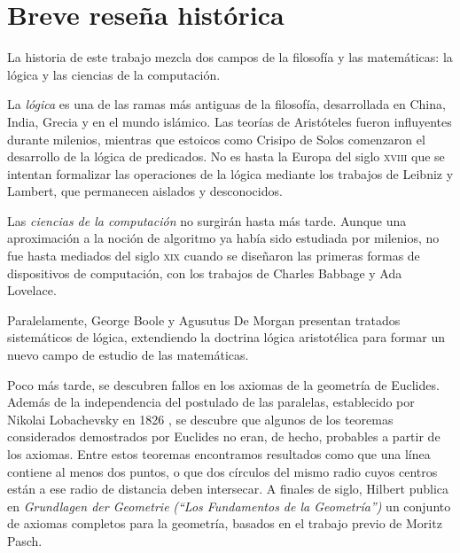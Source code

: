 

\chapter{Breve reseña histórica}\label{ch:historia}

La historia de este trabajo mezcla dos campos de la filosofía y las matemáticas: la lógica y las ciencias de la computación.

La \emph{lógica} es una de las ramas más antiguas de la filosofía, desarrollada en China, India, Grecia y en el mundo islámico. Las teorías de Aristóteles fueron influyentes durante milenios, mientras que estoicos como Crisipo de Solos comenzaron el desarrollo de la lógica de predicados. No es hasta la Europa del siglo \textsc{xviii} que se intentan formalizar las operaciones de la lógica mediante los trabajos de Leibniz y Lambert, que permanecen aislados y desconocidos. \cite{Katz2009}

Las \emph{ciencias de la computación} no surgirán hasta más tarde. Aunque una aproximación a la noción de algoritmo ya había sido estudiada por milenios, no fue hasta mediados del siglo \textsc{xix} cuando se diseñaron las primeras formas de dispositivos de computación, con los trabajos de Charles Babbage y Ada Lovelace. \cite {Fuegi2003}

Paralelamente, George Boole y Agusutus De Morgan presentan tratados sistemáticos de lógica, extendiendo la doctrina lógica aristotélica para formar un nuevo campo de estudio de las matemáticas.

Poco más tarde, se descubren fallos en los axiomas de la geometría de Euclides. Además de la independencia del postulado de las paralelas, establecido por Nikolai Lobachevsky en 1826 \cite{Bonola1955}, se descubre que algunos de los teoremas considerados demostrados por Euclides no eran, de hecho, probables a partir de los axiomas. Entre estos teoremas encontramos resultados como que una línea contiene al menos dos puntos, o que dos círculos del mismo radio cuyos centros están a ese radio de distancia deben intersecar. A finales de siglo, Hilbert \cite{Katz2009} publica en \emph{Grundlagen der Geometrie} \textit{(``Los Fundamentos de la Geometría'')} un conjunto de axiomas completos para la geometría, basados en el trabajo previo de Moritz Pasch.

